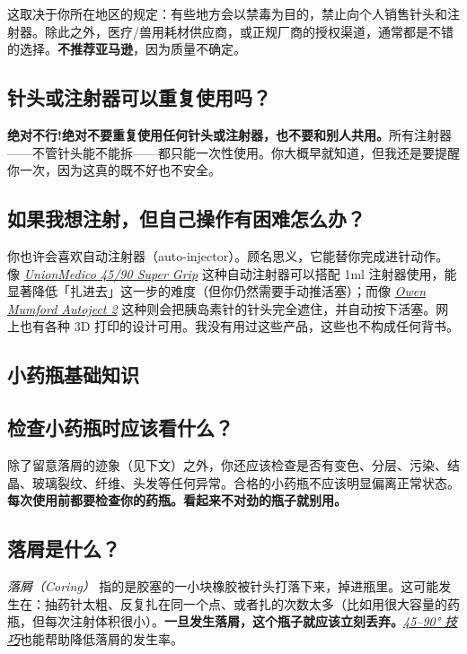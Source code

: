 \documentclass{article}
\begin{document}
这取决于你所在地区的规定：有些地方会以禁毒为目的，禁止向个人销售针头和注射器。除此之外，医疗/兽用耗材供应商，或正规厂商的授权渠道，通常都是不错的选择。\textbf{不推荐亚马逊}，因为质量不确定。

\subsection{针头或注射器可以重复使用吗？}

\textbf{绝对不行!绝对不要重复使用任何针头或注射器，也不要和别人共用。}所有注射器——不管针头能不能拆——都只能一次性使用。你大概早就知道，但我还是要提醒你一次，因为这真的既不好也不安全。

\subsection{如果我想注射，但自己操作有困难怎么办？}\label{5-21}

你也许会喜欢自动注射器（auto-injector）。顾名思义，它能替你完成进针动作。像 \href{https://unionmedico.com/90-super-grip/}{\textit{UnionMedico 45/90 Super Grip}} 这种自动注射器可以搭配 1ml 注射器使用，能显著降低「扎进去」这一步的难度（但你仍然需要手动推活塞）；而像 \href{https://www.youtube.com/watch?v=hPbhEpUN43Y}{\textit{Owen Mumford Autoject 2}} 这种则会把胰岛素针的针头完全遮住，并自动按下活塞。网上也有各种 3D 打印的设计可用。我没有用过这些产品，这些也不构成任何背书。

\subsection*{小药瓶基础知识}

\subsection{检查小药瓶时应该看什么？}

除了留意落屑的迹象（见下文）之外，你还应该检查是否有变色、分层、污染、结晶、玻璃裂纹、纤维、头发等任何异常。合格的小药瓶不应该明显偏离正常状态。\textbf{每次使用前都要检查你的药瓶。看起来不对劲的瓶子就别用。}

\subsection{落屑是什么？}\label{5-23}

\textit{落屑（Coring）} 指的是胶塞的一小块橡胶被针头打落下来，掉进瓶里。这可能发生在：抽药针太粗、反复扎在同一个点、或者扎的次数太多（比如用很大容量的药瓶，但每次注射体积很小）。\textbf{一旦发生落屑，这个瓶子就应该立刻丢弃。}\href{https://www.youtube.com/watch?v=w5F0SLoMjC8}{\textit{45–90° 技巧}}也能帮助降低落屑的发生率。
\end{document}
